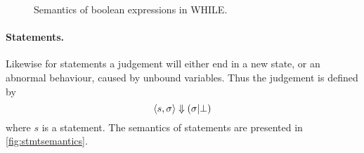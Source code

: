 \begin{figure}[h!]
\inference[EBCst]{}
{}


{}

{}

{}


{}

{}

{}


{}

{}

\caption{Semantics of boolean expressions in WHILE.}
\label{fig:bexprsemantics}
\end{figure}

\paragraph{Statements.}\label{sec:stmtsemantics}
Likewise for statements a judgement will either end in a new state, or an abnormal behaviour, caused by unbound variables. Thus the judgement is defined by
$$\langle s, \sigma \rangle \Downarrow (\sigma | \bot)$$
where $s$ is a statement.
The semantics of statements are presented in \autoref{fig:stmtsemantics}.

